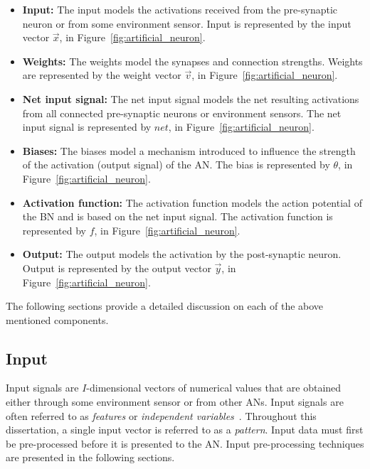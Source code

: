 \begin{itemize}
      \item \textbf{Input:} The input models the activations received from the pre-synaptic neuron or from some environment sensor. Input is represented by the input vector $\vec{x}$, in Figure~\ref{fig:artificial_neuron}.

      \item \textbf{Weights:} The weights model the synapses and connection strengths. Weights are represented by the weight vector $\vec{v}$, in Figure~\ref{fig:artificial_neuron}.

      \item {}\textbf{Net input signal:} The net input signal models the net resulting activations from all connected pre-synaptic neurons or environment sensors. The net input signal is represented by $net$, in Figure~\ref{fig:artificial_neuron}.

      \item \textbf{Biases:} The biases model a mechanism introduced to influence the strength of the activation (output signal) of the \acs{AN}. The bias is represented by $\theta$, in Figure~\ref{fig:artificial_neuron}.

      \item {}\textbf{Activation function:} The activation function models the action potential of the \acs{BN} and is based on the net input signal. The activation function is represented by $f$, in Figure~\ref{fig:artificial_neuron}.

      \item \textbf{Output:} The output models the activation by the post-synaptic neuron. Output is represented by the output vector $\vec{y}$, in Figure~\ref{fig:artificial_neuron}.
\end{itemize}

\noindent
The following sections provide a detailed discussion on each of the above mentioned components.


\subsection{Input}\label{sec:anns:an:input}

Input signals are $I$-dimensional vectors of numerical values that are obtained either through some environment sensor or from other \acp{AN}. Input signals are often referred to as \textit{features} or \textit{independent variables}~\cite{ref:francis:2001}. Throughout this dissertation, a single input vector is referred to as a \textit{pattern}. Input data must first be pre-processed before it is presented to the \acs{AN}. Input pre-processing techniques are presented in the following sections.


